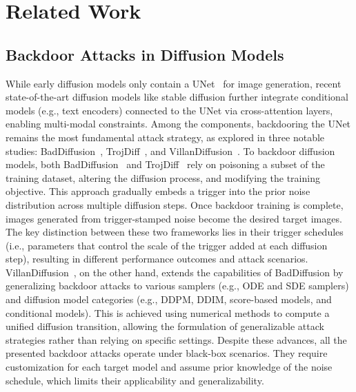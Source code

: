 \section{Related Work}
\label{section:related-work}

\subsection{Backdoor Attacks in Diffusion Models}
While early diffusion models only contain a UNet~\cite{ronneberger2015u} for image generation, recent state-of-the-art diffusion models like stable diffusion further integrate conditional models (e.g., text encoders) connected to the UNet via cross-attention layers, enabling multi-modal constraints. Among the components, backdooring the UNet remains the most fundamental attack strategy, as explored in three notable studies: BadDiffusion~\cite{Chou2023CVPR}, TrojDiff~\cite{chen2023trojdiff}, and VillanDiffusion~\cite{chou2024villandiffusion}. 
To backdoor diffusion models, both BadDiffusion~\cite{Chou2023CVPR} and TrojDiff~\cite{chen2023trojdiff} rely on poisoning a subset of the training dataset, altering the diffusion process, and modifying the training objective. This approach gradually embeds a trigger into the prior noise distribution across multiple diffusion steps. Once backdoor training is complete, images generated from trigger-stamped noise become the desired target images. The key distinction between these two frameworks lies in their trigger schedules (i.e., parameters that control the scale of the trigger added at each diffusion step), resulting in different performance outcomes and attack scenarios. 
VillanDiffusion~\cite{chou2024villandiffusion}, on the other hand, extends the capabilities of BadDiffusion by generalizing backdoor attacks to various samplers (e.g., ODE and SDE samplers) and diffusion model categories (e.g., DDPM, DDIM, score-based models, and conditional models). This is achieved using numerical methods to compute a unified diffusion transition, allowing the formulation of generalizable attack strategies rather than relying on specific settings.
Despite these advances, all the presented backdoor attacks operate under black-box scenarios. They require customization for each target model and assume prior knowledge of the noise schedule, which limits their applicability and generalizability.

